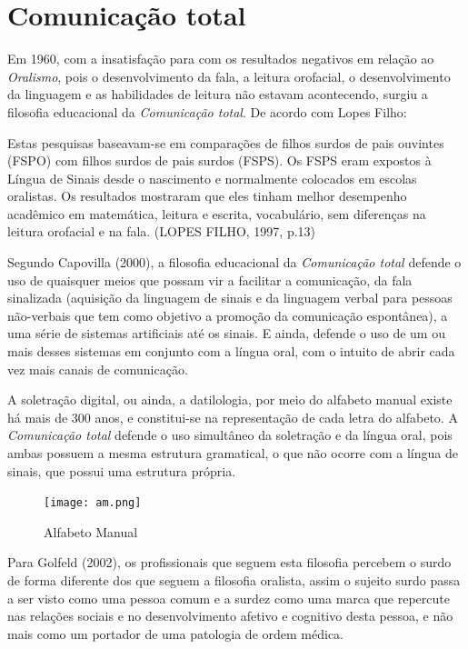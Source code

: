 \documentclass[brasil]{abnt}
\begin{document}
		\section{Comunicação total}
		Em 1960, com a insatisfação para com os resultados negativos em relação ao \textit{Oralismo}, pois o desenvolvimento da fala, a leitura orofacial, o desenvolvimento da linguagem e as habilidades de 
		leitura não estavam acontecendo, surgiu a filosofia educacional da \textit{Comunicação total}. De acordo com Lopes Filho:
		
			\begin{citacao} Estas pesquisas baseavam-se em comparações de filhos surdos de pais ouvintes (FSPO) com filhos surdos de pais surdos (FSPS). Os FSPS eram expostos à Língua de Sinais desde o 
							nascimento e normalmente colocados em escolas oralistas. Os resultados mostraram que eles tinham melhor desempenho acadêmico em matemática, leitura e escrita, vocabulário, sem 
							diferenças na leitura orofacial e na fala. (LOPES FILHO, 1997, p.13)
			\end{citacao}
		  
		 Segundo Capovilla (2000), a filosofia educacional da \textit{Comunicação total} defende o uso de quaisquer meios que possam vir a facilitar a comunicação, da fala sinalizada (aquisição da linguagem 
		 de sinais e da linguagem verbal para pessoas não-verbais que tem como objetivo a promoção da comunicação espontânea), a uma série de sistemas artificiais até os sinais. E ainda, defende o uso de um 
		 ou mais desses sistemas em conjunto com a língua oral, com o intuito de abrir cada vez mais canais de comunicação.
		 
		 A soletração digital, ou ainda, a datilologia, por meio do alfabeto manual existe há mais de 300 anos, e constitui-se na representação de cada letra do alfabeto. 
		 A \textit{Comunicação total} defende o uso simultâneo da soletração e da língua oral, pois ambas possuem a mesma estrutura gramatical, o que não ocorre com a língua de sinais, que possui uma estrutura
		 própria.
		 
				\begin{figure}[!htb]
						\center
						\caption{Alfabeto Manual}
						\texttt{[image: am.png]}
				\end{figure}
		 
		 Para Golfeld (2002), os profissionais que seguem esta filosofia percebem o surdo de forma diferente dos que seguem a filosofia oralista, assim o sujeito surdo passa a ser visto como uma pessoa comum 
		 e a surdez como uma marca que repercute nas relações sociais e no desenvolvimento afetivo e cognitivo desta pessoa, e não mais como um portador de uma patologia de ordem médica.
		 
\end{document}
